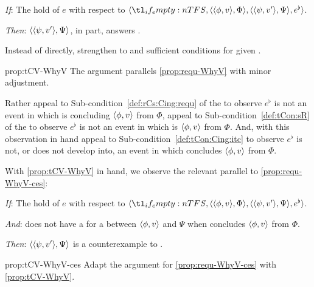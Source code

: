 \begin{note}
  \begin{proposition}
    \label{prop:tCV-WhyV}
    \vspace{-\baselineskip}
    \begin{itenum}
    \item[\emph{If}:]
      The  hold of \(e\) with respect to \(\langle \vAgent{}, \pvp{\phi}{v}{\Phi}, \pvp{\psi}{v'}{\Psi}, e^{\flat} \rangle\).
    \item[\emph{Then}:]
      \(\langle \langle \psi, v' \rangle, \Psi \rangle\), in part, answers \qWhyV{}.
    \end{itenum}
    \vspace{-1.5\baselineskip}
  \end{proposition}

  Instead of \requ{} directly, strengthen to \tCV{} and sufficient conditions for \requ{} given \tCV{}.

  \begin{argument}{prop:tCV-WhyV}
    The argument parallels \autoref{prop:requ-WhyV} with  minor adjustment.

    Rather appeal to Sub-condition~\ref{def:rCs:Cing:requ} of the \rCon{} to observe \(e^{\flat}\) is not an event in which \vAgent{} is concluding \(\langle \phi, v \rangle\) from \(\Phi\), appeal to Sub-condition~\ref{def:tCon:sR} of the \tCon{} to observe \(e^{\flat}\) is not an event in which \vAgent{} is \tCV{} \(\langle \phi, v \rangle\) from \(\Phi\).
    And, with this observation in hand appeal to Sub-condition~\ref{def:tCon:Cing:itc} to observe \(e^{\flat}\) is not, or does not develop into, an event in which \vAgent{} concludes \(\langle \phi, v \rangle\) from \(\Phi\).
  \end{argument}

  \noindent%
  With \autoref{prop:tCV-WhyV} in hand, we observe the relevant parallel to \autoref{prop:requ-WhyV-ces}:

  \begin{proposition}
    \label{prop:tCV-WhyV-ces}
    \vspace{-\baselineskip}
    \begin{itenum}
    \item[\emph{If}:]
      The  hold of \(e\) with respect to \(\langle \vAgent{}, \pvp{\phi}{v}{\Phi}, \pvp{\psi}{v'}{\Psi}, e^{\flat} \rangle\).
    \item[\emph{And}:]
      \vAgent{} does not have a \wit{} for a \ros{} between \(\langle \phi, v \rangle\) and \(\Psi\) when \vAgent{} concludes \(\langle \phi, v \rangle\) from \(\Phi\).
    \item[\emph{Then}:]
      \(\langle \langle \psi, v' \rangle, \Psi \rangle\) is a counterexample to \issueConstraint{}.
    \end{itenum}
    \vspace{-\baselineskip}
  \end{proposition}

  \begin{argument}{prop:tCV-WhyV-ces}
    Adapt the argument for \autoref{prop:requ-WhyV-ces} with \autoref{prop:tCV-WhyV}.
  \end{argument}
\end{note}

